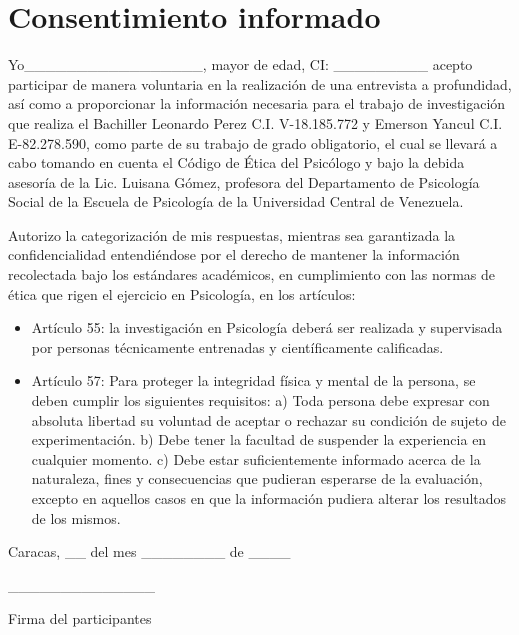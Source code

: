 
\chapter{Consentimiento informado}\label{ch:consentimiento}

\small

Yo\_\_\_\_\_\_\_\_\_\_\_\_\_\_\_\_\_, mayor de edad, CI: \_\_\_\_\_\_\_\_\_ acepto
participar de manera voluntaria en la realización de una entrevista a
profundidad, así como a proporcionar la información necesaria para el trabajo de
investigación que realiza el Bachiller Leonardo Perez C.I. V-18.185.772 y
Emerson Yancul C.I. E-82.278.590, como parte de su trabajo de grado
obligatorio, el cual se llevará a cabo tomando en cuenta el Código de Ética del
Psicólogo y bajo la debida asesoría de la Lic. Luisana Gómez, profesora del
Departamento de Psicología Social de la Escuela de Psicología de la Universidad
Central de Venezuela.

Autorizo la categorización de mis respuestas, mientras sea garantizada la
confidencialidad entendiéndose por el derecho de mantener la información
recolectada bajo los estándares académicos, en cumplimiento con las normas de
ética que rigen el ejercicio en Psicología, en los artículos:

\begin{itemize}
    \item Artículo 55: la investigación en Psicología deberá ser realizada y
    supervisada por personas técnicamente entrenadas y científicamente
    calificadas.
    \item Artículo 57: Para proteger la integridad física y mental de la
    persona, se deben cumplir los siguientes requisitos: a) Toda persona debe
    expresar con absoluta libertad su voluntad de aceptar o rechazar su
    condición de sujeto de experimentación. b) Debe tener la facultad de
    suspender la experiencia en cualquier momento. c) Debe estar suficientemente
    informado acerca de la naturaleza, fines y consecuencias que pudieran
    esperarse de la evaluación, excepto en aquellos casos en que la información
    pudiera alterar los resultados de los mismos.
\end{itemize}

\centering

Caracas, \_\_ del mes \_\_\_\_\_\_\_\_ de \_\_\_\_

\vfill

\_\_\_\_\_\_\_\_\_\_\_\_\_\_

Firma del participantes